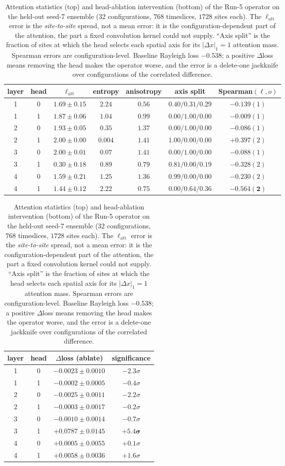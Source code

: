 \documentclass[11pt,a4paper]{article}
\begin{document}
\begin{table}[htbp]
  \centering
  \begin{tabular}{ccccccc}
    \toprule
    layer & head & $\ell_{\mathrm{att}}$ & entropy & anisotropy
          & axis split & Spearman$(\ell,o)$ \\
    \midrule
    1 & 0 & $1.69\pm0.15$ & $2.24$ & $0.56$ & $0.40/0.31/0.29$ & $-0.139(1)$ \\
    1 & 1 & $1.87\pm0.06$ & $1.04$ & $0.99$ & $0.00/1.00/0.00$ & $-0.009(1)$ \\
    2 & 0 & $1.93\pm0.05$ & $0.35$ & $1.37$ & $0.00/1.00/0.00$ & $-0.086(1)$ \\
    2 & 1 & $2.00\pm0.00$ & $0.004$ & $1.41$ & $1.00/0.00/0.00$ & $+0.397(2)$ \\
    3 & 0 & $2.00\pm0.01$ & $0.07$ & $1.41$ & $0.00/1.00/0.00$ & $-0.088(1)$ \\
    3 & 1 & $\mathbf{0.30\pm0.18}$ & $0.89$ & $0.79$ & $0.81/0.00/0.19$
      & $-0.328(2)$ \\
    4 & 0 & $1.59\pm0.21$ & $1.25$ & $1.36$ & $0.99/0.00/0.00$ & $-0.230(2)$ \\
    4 & 1 & $1.44\pm0.12$ & $2.22$ & $0.75$ & $0.00/0.64/0.36$
      & $\mathbf{-0.564(2)}$ \\
    \bottomrule
  \end{tabular}

  \vspace{1.2em}

  \begin{tabular}{cccc}
    \toprule
    layer & head & $\Delta$loss (ablate) & significance \\
    \midrule
    1 & 0 & $-0.0023\pm0.0010$ & $-2.3\sigma$ \\
    1 & 1 & $-0.0002\pm0.0005$ & $-0.4\sigma$ \\
    2 & 0 & $-0.0025\pm0.0011$ & $-2.2\sigma$ \\
    2 & 1 & $-0.0003\pm0.0017$ & $-0.2\sigma$ \\
    3 & 0 & $-0.0010\pm0.0014$ & $-0.7\sigma$ \\
    3 & 1 & $\mathbf{+0.0787\pm0.0145}$ & $\mathbf{+5.4\sigma}$ \\
    4 & 0 & $+0.0005\pm0.0055$ & $+0.1\sigma$ \\
    4 & 1 & $+0.0058\pm0.0036$ & $+1.6\sigma$ \\
    \bottomrule
  \end{tabular}
  \caption{Attention statistics (top) and head-ablation intervention (bottom)
  of the Run-5 operator on the held-out seed-7 ensemble ($32$ configurations,
  $768$ timeslices, $1728$ sites each). The $\ell_{\mathrm{att}}$ error is the
  \emph{site-to-site} spread, not a mean error: it is the
  configuration-dependent part of the attention, the part a fixed convolution
  kernel could not supply. ``Axis split'' is the fraction of sites at which
  the head selects each spatial axis for its $|\Delta x|_1=1$ attention mass.
  Spearman errors are configuration-level. Baseline Rayleigh loss $-0.538$;
  a positive $\Delta$loss means removing the head makes the operator worse,
  and the error is a delete-one jackknife over configurations of the
  correlated difference.}
  \label{tab:attention}
\end{table}
\end{document}
